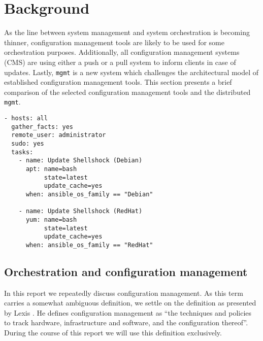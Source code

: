 \section{Background}\label{sec:background}
As the line between system management and system orchestration is becoming thinner, configuration management tools are likely to be used for some orchestration purposes. Additionally, all configuration management systems (CMS) are using either a push or a pull system to inform clients in case of updates. Lastly, \texttt{mgmt} is a new system which challenges the architectural model of established configuration management tools. This section presents a brief comparison of the selected configuration management tools and the distributed \texttt{mgmt}.

\begin{lstlisting}[caption={Shellshock security patching with Ansible playbook},label=lst:shellshock]
- hosts: all
  gather_facts: yes
  remote_user: administrator
  sudo: yes
  tasks:
    - name: Update Shellshock (Debian)
      apt: name=bash
           state=latest
           update_cache=yes
      when: ansible_os_family == "Debian"
 
    - name: Update Shellshock (RedHat)
      yum: name=bash
           state=latest
           update_cache=yes
      when: ansible_os_family == "RedHat"
\end{lstlisting}

\subsection{Orchestration and configuration management}\label{subsec:orchestration}
In this report we repeatedly discuss configuration management. As this term carries a somewhat ambiguous definition, we settle on the definition as presented by Lexis \cite{}. He defines configuration management as ``the techniques and policies to track hardware, infrastructure and software, and the configuration thereof''. During the course of this report we will use this definition exclusively.


